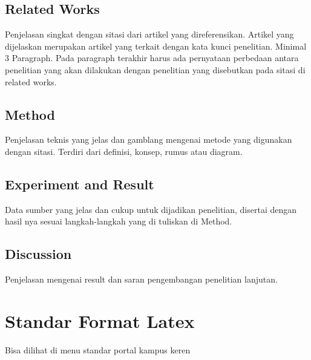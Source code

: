 \subsection{Related Works}
Penjelasan singkat dengan sitasi dari artikel yang direferensikan. Artikel yang dijelaskan merupakan artikel yang terkait dengan kata kunci penelitian. Minimal 3 Paragraph. Pada paragraph terakhir harus ada pernyataan perbedaan antara penelitian yang akan dilakukan dengan penelitian yang disebutkan pada sitasi di related works.

\subsection{Method}

Penjelasan teknis yang jelas dan gamblang mengenai metode yang digunakan dengan sitasi. Terdiri dari definisi, konsep, rumus atau diagram.

\subsection{Experiment and Result}
Data sumber yang jelas dan cukup untuk dijadikan penelitian, disertai dengan hasil nya sesuai langkah-langkah yang di tuliskan di Method.

\subsection{Discussion}
Penjelasan mengenai result dan saran pengembangan penelitian lanjutan.


\section{Standar Format Latex}
Bisa dilihat di menu standar portal kampus keren